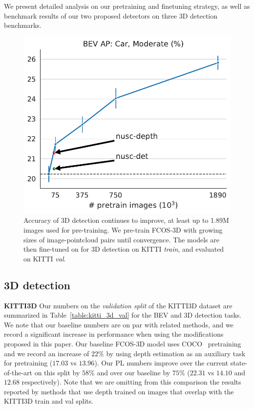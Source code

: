 We present detailed analysis on our pretraining and finetuning strategy, as well as benchmark results of our two proposed detectors on three 3D detection benchmarks.




\begin{figure}[h]
    \includegraphics[width=0.99\columnwidth,trim={0mm 0mm 0mm 0mm},clip]{figures/scaling_law.pdf}
    \caption{Accuracy of 3D detection continues to improve, at least up to 1.89M images used for pre-training. We pre-train FCOS-3D with growing sizes of image-pointcloud pairs until convergence. The models are then fine-tuned on for 3D detection on KITTI \emph{train}, and evaluated on KITTI \emph{val}.}
    \label{fig:pretraining_vs_depth}
\end{figure}




\subsection{3D detection}
\label{subsec:3d_detection}

\noindent\textbf{KITTI3D} Our numbers on the \textit{validation split} of the KITTI3D dataset are summarized in Table~\ref{table:kitti_3d_val} for the BEV and 3D detection tasks. We note that our baseline numbers are on par with related methods, and we record a significant increase in performance when using the modifications proposed in this paper. Our baseline FCOS-3D model uses COCO~\cite{lin2014microsoft} pretraining and we record an increase of $22\%$ by using depth estimation as an auxiliary task for pretraining ($17.03$ vs $13.96$). Our PL numbers improve over the current state-of-the-art on this split by $58\%$ and over our baseline by $75\%$ ($22.31$ vs $14.10$ and $12.68$ respectively). Note that we are omitting from this comparison the results reported by methods that use depth trained on images that overlap with the KITTI3D train and val splits. 

